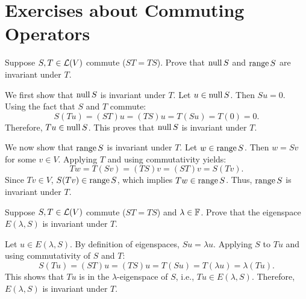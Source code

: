 \section*{Exercises about Commuting Operators}

\begin{xrcs}
  Suppose $S, T \in \mathcal{L}(V)$ commute ($ST = TS$). Prove that $\operatorname{null} S$ and $\operatorname{range} S$ are invariant under $T$.

  \begin{xprf}
    \StepOne We first show that $\operatorname{null} S$ is invariant under $T$.
    Let $u \in \operatorname{null} S$. Then $Su = 0$. Using the fact that $S$ and $T$ commute:
    \begin{equation}
      S(Tu) = (ST)u = (TS)u = T(Su) = T(0) = 0.
    \end{equation}
    Therefore, $Tu \in \operatorname{null} S$. This proves that $\operatorname{null} S$ is invariant under $T$.

    \StepTwo We now show that $\operatorname{range} S$ is invariant under $T$.
    Let $w \in \operatorname{range} S$. Then $w = Sv$ for some $v \in V$. Applying $T$ and using commutativity yields:
    \begin{equation}
      Tw = T(Sv) = (TS)v = (ST)v = S(Tv).
    \end{equation}
    Since $Tv \in V$, $S(Tv) \in \operatorname{range} S$, which implies $Tw \in \operatorname{range} S$.
    Thus, $\operatorname{range} S$ is invariant under $T$.
  \end{xprf}
\end{xrcs}

\begin{xrcs}
  Suppose $S, T \in \mathcal{L}(V)$ commute ($ST = TS$) and $\lambda \in \mathbb{F}$. Prove that the eigenspace $E(\lambda, S)$ is invariant under $T$.

  \begin{xprf}
    Let $u \in E(\lambda, S)$. By definition of eigenspaces, $Su = \lambda u$.
    Applying $S$ to $Tu$ and using commutativity of $S$ and $T$:
    \begin{equation}
      S(Tu) = (ST)u = (TS)u = T(Su) = T(\lambda u) = \lambda (Tu).
    \end{equation}
    This shows that $Tu$ is in the $\lambda$-eigenspace of $S$, i.e., $Tu \in E(\lambda, S)$.
    Therefore, $E(\lambda, S)$ is invariant under $T$.
  \end{xprf}
\end{xrcs}
